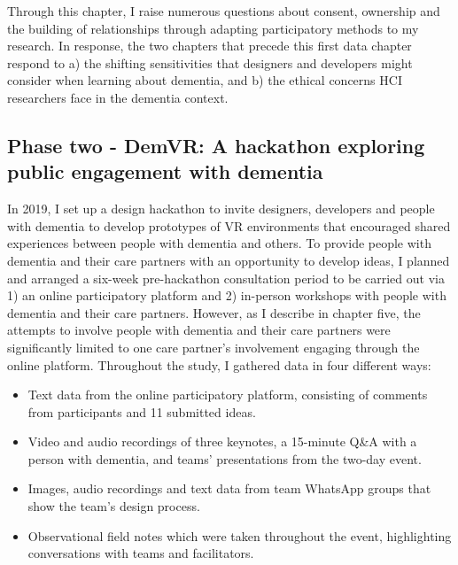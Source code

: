 Through this chapter, I raise numerous questions about consent, ownership and the building of relationships through adapting participatory methods to my research. In response, the two chapters that precede this first data chapter respond to a) the shifting sensitivities that designers and developers might consider when learning about dementia, and b) the ethical concerns HCI researchers face in the dementia context.

\subsection{Phase two - DemVR: A hackathon exploring public engagement with dementia}


In 2019, I set up a design hackathon to invite designers, developers and people with dementia to develop prototypes of VR environments that encouraged shared experiences between people with dementia and others. To provide people with dementia and their care partners with an opportunity to develop ideas, I planned and arranged a six-week pre-hackathon consultation period to be carried out via 1) an online participatory platform and 2) in-person workshops with people with dementia and their care partners. However, as I describe in chapter five, the attempts to involve people with dementia and their care partners were significantly limited to one care partner's involvement engaging through the online platform. Throughout the study, I gathered data in four different ways:
\begin{itemize}
    \item Text data from the online participatory platform, consisting of comments from participants and 11 submitted ideas.
    \item Video and audio recordings of three keynotes, a 15-minute Q\&A with a person with dementia, and teams' presentations from the two-day event.
    \item Images, audio recordings and text data from team WhatsApp groups that show the team's design process.
    \item Observational field notes which were taken throughout the event, highlighting conversations with teams and facilitators.
\end{itemize}

